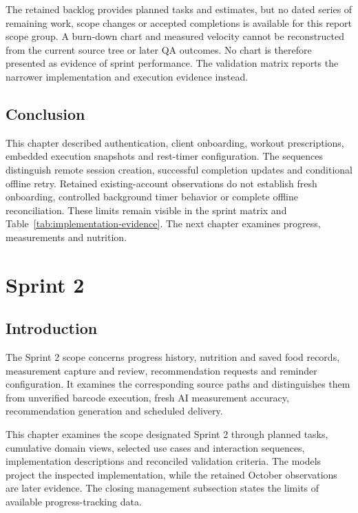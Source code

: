 \documentclass[12pt,a4paper,openany]{report}
\begin{document}
The retained backlog provides planned tasks and estimates, but no dated series of remaining work, scope changes or accepted completions is available for this report scope group. A burn-down chart and measured velocity cannot be reconstructed from the current source tree or later QA outcomes. No chart is therefore presented as evidence of sprint performance. The validation matrix reports the narrower implementation and execution evidence instead.


\section*{Conclusion}

This chapter described authentication, client onboarding, workout prescriptions, embedded execution snapshots and rest-timer configuration. The sequences distinguish remote session creation, successful completion updates and conditional offline retry. Retained existing-account observations do not establish fresh onboarding, controlled background timer behavior or complete offline reconciliation. These limits remain visible in the sprint matrix and Table~\ref{tab:implementation-evidence}. The next chapter examines progress, measurements and nutrition.


\chapter{Sprint 2}


\section*{Introduction}

The Sprint 2 scope concerns progress history, nutrition and saved food records, measurement capture and review, recommendation requests and reminder configuration. It examines the corresponding source paths and distinguishes them from unverified barcode execution, fresh AI measurement accuracy, recommendation generation and scheduled delivery.


This chapter examines the scope designated Sprint 2 through planned tasks, cumulative domain views, selected use cases and interaction sequences, implementation descriptions and reconciled validation criteria. The models project the inspected implementation, while the retained October observations are later evidence. The closing management subsection states the limits of available progress-tracking data.
\end{document}
